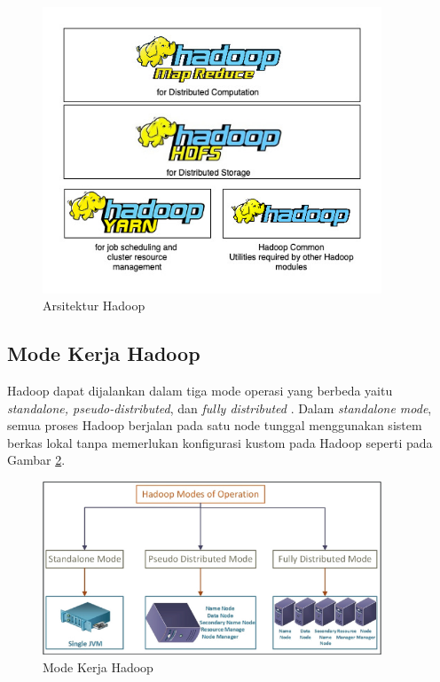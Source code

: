 \begin{figure}[h!]
    \centering
    \includegraphics[width=0.9\textwidth]{figures/ch02/hadoop-str}
    \caption{Arsitektur Hadoop}
    \label{fig:hadoop-str}
\end{figure}

\subsection{Mode Kerja Hadoop}
Hadoop dapat dijalankan dalam tiga mode operasi yang berbeda yaitu \textit{standalone, pseudo-distributed}, dan \textit{fully distributed} \cite{johnDataLakeEnterprises2017}. Dalam \textit{standalone mode}, semua proses Hadoop berjalan pada satu node tunggal menggunakan sistem berkas lokal tanpa memerlukan konfigurasi kustom pada Hadoop seperti pada Gambar \ref{fig:hadoop-modes}. 

\begin{figure}[h!]
    \centering
    \includegraphics[width=0.9\textwidth]{figures/ch02/hadoop-modes}
    \caption{Mode Kerja Hadoop \cite{khataiImplementationTextMining2021}}
    \label{fig:hadoop-modes}
\end{figure}

